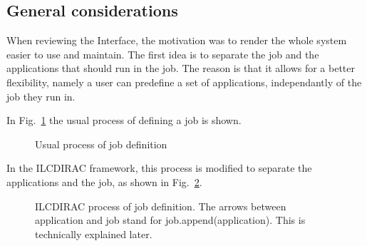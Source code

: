 \documentclass[a4paper,12pt]{article}
\begin{document}
\subsection{General considerations}
When reviewing the Interface, the motivation was to render the whole system
easier to use and maintain. The first idea is to separate the job and the
applications that should run in the job. The reason is that it allows for a
better flexibility, namely a user can predefine a set of applications,
independantly of the job they run in.

In Fig.~\ref{fig:defdefinejob} the usual process of defining a job is shown. 
\begin{figure}[h]
\begin{center}
\end{center}
\caption{Usual process of job definition}
\label{fig:defdefinejob}
\end{figure}
In the ILCDIRAC framework, this process is modified to separate the applications
and the job, as shown in Fig.~\ref{fig:definejob}.
\begin{figure}[h]
\begin{center}
\end{center}
\caption{ILCDIRAC process of job definition. The arrows between application and
job stand for job.append(application). This is
technically explained later.}
\label{fig:definejob}
\end{figure}
\end{document}
